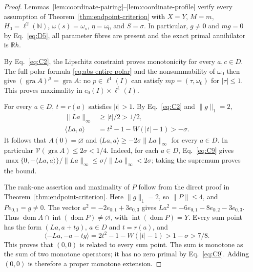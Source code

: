 \documentclass[11pt]{article}
\newcommand{\R}{\mathbb R}
\newcommand{\N}{\mathbb N}
\newcommand{\gra}{\operatorname{gra}}
\newcommand{\dom}{\operatorname{dom}}
\newcommand{\pair}[2]{\langle #1,#2\rangle}
\theoremstyle{definition}
\theoremstyle{remark}
\begin{document}
\begin{proof}
Lemmas~\ref{lem:coordinate-pairing}--\ref{lem:coordinate-profile}
verify every assumption of Theorem~\ref{thm:endpoint-criterion}
with $X=Y$, $M=m$, $H_0=\ell^2(\N)$, $\omega(s)=\omega_s$,
$\eta=\omega_0$ and $S=\sigma$. In particular, $g\ne0$ and $mg=0$
by Eq.~\eqref{eq:D5}, all parameter fibres are present and the
exact primal annihilator is $\R h$.

By Eq.~\eqref{eq:C2}, the Lipschitz constraint proves monotonicity
for every $a,c\in D$. The full polar formula
\eqref{eq:abs-entire-polar} and the nonsummability of $\omega_0$
then give $(\gra A)^\mu=\gra A$: no $p\in\ell^1(I)$ can
satisfy $mp=(\tau,\omega_0)$ for $|\tau|\le1$. This proves
maximality in $c_0(I)\times\ell^1(I)$.

\label{sec:C5}
For every $a\in D$, $t=r(a)$ satisfies $|t|>1$. By Eq.~\eqref{eq:C2}
and $\|g\|_1=2$,
\begin{equation}
\begin{aligned}
\|La\|_\infty&\ge|t|/2>1/2,\\
\pair{La}{a}&=t^2-1-W(|t|-1)>-\sigma.
\end{aligned}
\label{eq:C9}
\end{equation}
It follows that $A(0)=\varnothing$ and
$\pair{La}{a}\ge-2\sigma\|La\|_\infty$ for every $a\in D$.
In particular $\mathcal V(\gra A)\le2\sigma<1/4$.
Indeed, for each $a\in D$, Eq.~\eqref{eq:C9} gives
$\max\{0,-\pair{La}{a}\}/\|La\|_\infty
\le\sigma/\|La\|_\infty<2\sigma$; taking the supremum proves the bound.

\label{sec:C6}
The rank-one assertion and maximality of $P$ follow from the direct
proof in Theorem~\ref{thm:endpoint-criterion}. Here $\|g\|_1=2$,
so $\|P\|\le4$, and $Pe_{0,1}=g\ne0$.
The vector $a^2=-2e_{0,1}+3e_{0,3}$ gives
$La^2=-6e_{0,1}-8e_{0,2}-3e_{0,3}$. Thus
$\dom A\cap\operatorname{int}(\dom P)\ne\varnothing$, with
$\operatorname{int}(\dom P)=Y$. Every sum point has the form
$(La,a+tg)$, $a\in D$ and $t=r(a)$, and
\begin{equation}
\pair{-La}{-a-tg}=2t^2-1-W(|t|-1)>1-\sigma>7/8.
\label{eq:C11}
\end{equation}
This proves that $(0,0)$ is related to every sum point. The sum is
monotone as the sum of two monotone operators; it has no zero primal by
Eq.~\eqref{eq:C9}. Adding $(0,0)$ is therefore a proper monotone extension.

\end{proof}

\label{sec:domain-comparison}
\end{document}
